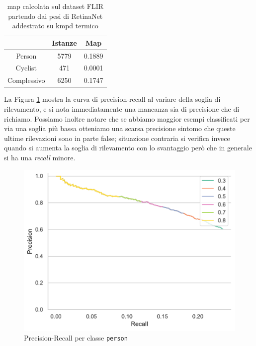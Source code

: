 \begin{table}[]
    \centering
    \begin{tabular}{c|c|c|}
    \cline{2-3}
     & Istanze & Map \\ \hline
    \multicolumn{1}{|c|}{Person} & 5779 & 0.1889 \\ \hline
    \multicolumn{1}{|c|}{Cyclist} & 471 & 0.0001 \\ \hline
    \multicolumn{1}{|c|}{Complessivo} & 6250 & 0.1747 \\ \hline
    \end{tabular}
    \caption{\ac{map} calcolata sul dataset FLIR partendo dai pesi di RetinaNet addestrato su \ac{kmpd} termico}
    \label{tab:first_experiment_flir}
\end{table}
La Figura \ref{fig:precision_recall_person_1} mostra la curva di precision-recall al variare della soglia di rilevamento, e si nota immediatamente una mancanza sia di precisione che di richiamo. Possiamo inoltre notare che se abbiamo maggior esempi classificati per via una soglia più bassa otteniamo una scarsa precisione sintomo che queste ultime rilevazioni sono in parte false; situazione contraria si verifica invece quando si aumenta la soglia di rilevamento con lo svantaggio però che in generale si ha una \textit{recall} minore.  
\begin{figure}[]
    \centering
    \includegraphics[width=\textwidth]{images/graphic/precision_recall_test_flir_kaist.pdf}
    \caption{Precision-Recall per classe \texttt{person}}
    \label{fig:precision_recall_person_1}
\end{figure}





